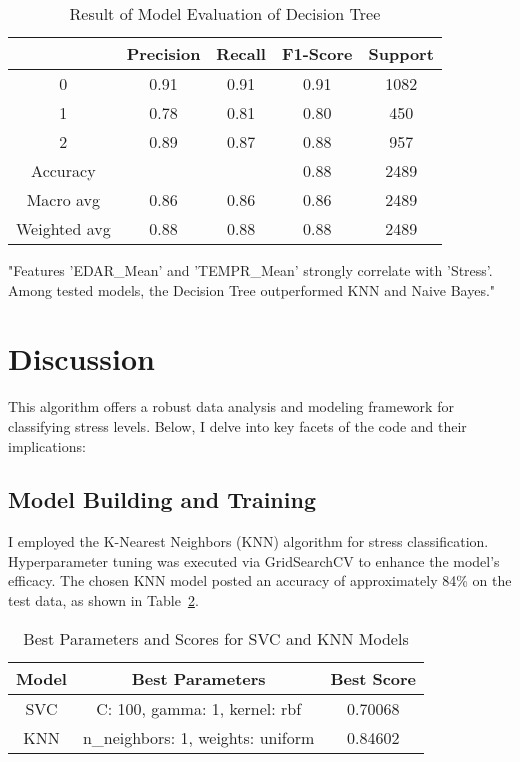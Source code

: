\documentclass{article}
\begin{document}
\newpage
\vspace{-0.1cm} %
\begin{table}
  \centering
  \caption{Result of Model Evaluation of Decision Tree}
  \label{tab:table4}
  {\footnotesize
  \begin{tabular}{|c|c|c|c|c|}
    \hline
    & Precision & Recall & F1-Score & Support \\ \hline
    0 & 0.91 & 0.91 & 0.91 & 1082 \\ \hline
    1 & 0.78 & 0.81 & 0.80 & 450 \\ \hline
    2 & 0.89 & 0.87 & 0.88 & 957 \\ \hline
    Accuracy & \multicolumn{2}{c|}{} & 0.88 & 2489 \\ \hline
    Macro avg & 0.86 & 0.86 & 0.86 & 2489 \\ \hline
    Weighted avg & 0.88 & 0.88 & 0.88 & 2489 \\ \hline
  \end{tabular}
  }
\end{table}


"Features 'EDAR\_Mean' and 'TEMPR\_Mean' strongly correlate with 'Stress'. Among tested models, the Decision Tree outperformed KNN and Naive Bayes."



\section{Discussion}
This algorithm offers a robust data analysis and modeling framework for classifying stress levels. Below, I delve into key facets of the code and their implications:

\subsection{Model Building and Training}
I employed the K-Nearest Neighbors (KNN) algorithm for stress classification. Hyperparameter tuning was executed via GridSearchCV to enhance the model's efficacy. The chosen KNN model posted an accuracy of approximately 84\% on the test data, as shown in Table~\ref{tab:table5}.

\vspace{-0.5cm} %

\begin{table}[htbp]
  \centering
  \caption{Best Parameters and Scores for SVC and KNN Models}
  \label{tab:table5}
  \begin{tabular}{|c|c|c|}
    \hline
    Model & Best Parameters & Best Score \\ \hline
    SVC & C: 100, gamma: 1, kernel: rbf & 0.70068 \\ \hline
    KNN & n\_neighbors: 1, weights: uniform & 0.84602 \\ \hline
  \end{tabular}
\end{table}
\end{document}
